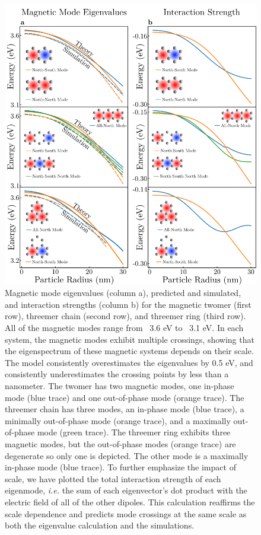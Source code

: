 \documentclass[journal=ancac3,manuscript=article]{achemso}
\begin{document}
\begin{figure}
\centering
\includegraphics[width=.65\paperwidth]{magnetic_mode_eigenvalues_and_interactions.png}
\caption{Magnetic mode eigenvalues (column a), predicted and simulated, and interaction strengths (column b) for the magnetic twomer (first row), threemer chain (second row), and threemer ring (third row). All of the magnetic modes range from ~3.6 eV to ~3.1 eV. In each system, the magnetic modes exhibit multiple crossings, showing that the eigenspectrum of these magnetic systems depends on their scale. The model consistently overestimates the eigenvalues by 0.5 eV, and consistently underestimates the crossing points by less than a nanometer. The twomer has two magnetic modes, one in-phase mode (blue trace) and one out-of-phase mode (orange trace). The threemer chain has three modes, an in-phase mode (blue trace), a minimally out-of-phase mode (orange trace), and a maximally out-of-phase mode (green trace). The threemer ring exhibits three magnetic modes, but the out-of-phase modes (orange trace) are degenerate so only one is depicted. The other mode is a maximally in-phase mode (blue trace). To further emphasize the impact of scale, we have plotted the total interaction strength of each eigenmode, \textit{i.e.} the sum of each eigenvector's dot product with the electric field of all of the other dipoles. This calculation reaffirms the scale dependence and predicts mode crossings at the same scale as both the eigenvalue calculation and the simulations.}
\label{fig:magmodes}
\end{figure}
\end{document}

